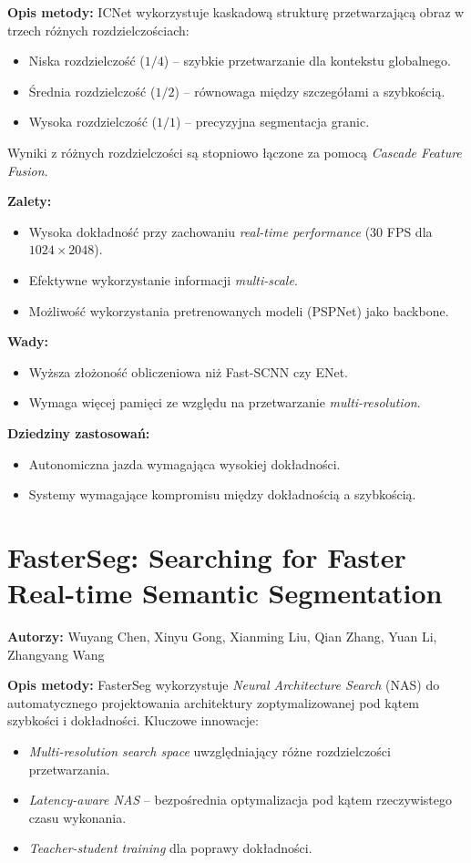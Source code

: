 \textbf{Opis metody:}
ICNet wykorzystuje kaskadową strukturę przetwarzającą obraz w trzech różnych rozdzielczościach:
\begin{itemize}
    \item Niska rozdzielczość ($1/4$) -- szybkie przetwarzanie dla kontekstu globalnego.
    \item Średnia rozdzielczość ($1/2$) -- równowaga między szczegółami a szybkością.
    \item Wysoka rozdzielczość ($1/1$) -- precyzyjna segmentacja granic.
\end{itemize}
Wyniki z różnych rozdzielczości są stopniowo łączone za pomocą \textit{Cascade Feature Fusion}.

\textbf{Zalety:}
\begin{itemize}
    \item Wysoka dokładność przy zachowaniu \textit{real-time performance} ($30$ FPS dla $1024\times2048$).
    \item Efektywne wykorzystanie informacji \textit{multi-scale}.
    \item Możliwość wykorzystania pretrenowanych modeli (PSPNet) jako backbone.
\end{itemize}

\textbf{Wady:}
\begin{itemize}
    \item Wyższa złożoność obliczeniowa niż Fast-SCNN czy ENet.
    \item Wymaga więcej pamięci ze względu na przetwarzanie \textit{multi-resolution}.
\end{itemize}

\textbf{Dziedziny zastosowań:}
\begin{itemize}
    \item Autonomiczna jazda wymagająca wysokiej dokładności.
    \item Systemy wymagające kompromisu między dokładnością a szybkością.
\end{itemize}

\section{FasterSeg: Searching for Faster Real-time Semantic Segmentation}
\textbf{Autorzy:} Wuyang Chen, Xinyu Gong, Xianming Liu, Qian Zhang, Yuan Li, Zhangyang Wang

\textbf{Opis metody:}
FasterSeg wykorzystuje \textit{Neural Architecture Search} (NAS) do automatycznego projektowania architektury zoptymalizowanej pod kątem szybkości i dokładności. Kluczowe innowacje:
\begin{itemize}
    \item \textit{Multi-resolution search space} uwzględniający różne rozdzielczości przetwarzania.
    \item \textit{Latency-aware NAS} -- bezpośrednia optymalizacja pod kątem rzeczywistego czasu wykonania.
    \item \textit{Teacher-student training} dla poprawy dokładności.
\end{itemize}

